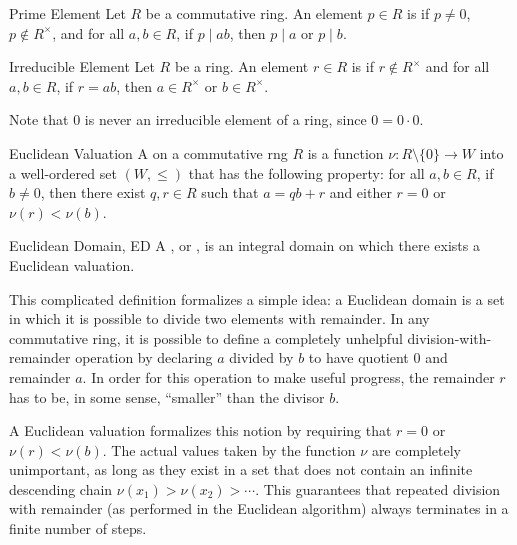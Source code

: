\begin{dfnbox}{Prime Element}
	Let $R$ be a commutative ring. An element $p \in R$ is  if $p \ne 0$, $p \notin R^\times$, and for all $a, b \in R$, if $p \mid ab$, then $p \mid a$ or $p \mid b$.
\end{dfnbox}

\begin{dfnbox}{Irreducible Element}
	Let $R$ be a ring. An element $r \in R$ is  if $r \notin R^\times$ and for all $a, b \in R$, if $r = ab$, then $a \in R^\times$ or $b \in R^\times$.
\end{dfnbox}

Note that $0$ is never an irreducible element of a ring, since $0 = 0 \cdot 0$.

\begin{dfnbox}{Euclidean Valuation}
	A  on a commutative rng $R$ is a function $\nu: R \setminus \{0\} \to W$ into a well-ordered set $(W, \le)$ that has the following property: for all $a, b \in R$, if $b \ne 0$, then there exist $q, r \in R$ such that $a = qb + r$ and either $r = 0$ or $\nu(r) < \nu(b)$.
\end{dfnbox}

\begin{dfnbox}{Euclidean Domain, ED}
	A , or , is an integral domain on which there exists a Euclidean valuation.
\end{dfnbox}

This complicated definition formalizes a simple idea: a Euclidean domain is a set in which it is possible to divide two elements with remainder. In any commutative ring, it is possible to define a completely unhelpful division-with-remainder operation by declaring $a$ divided by $b$ to have quotient $0$ and remainder $a$. In order for this operation to make useful progress, the remainder $r$ has to be, in some sense, ``smaller'' than the divisor $b$.

A Euclidean valuation formalizes this notion by requiring that $r = 0$ or $\nu(r) < \nu(b)$. The actual values taken by the function $\nu$ are completely unimportant, as long as they exist in a set that does not contain an infinite descending chain $\nu(x_1) > \nu(x_2) > \cdots$. This guarantees that repeated division with remainder (as performed in the Euclidean algorithm) always terminates in a finite number of steps.

